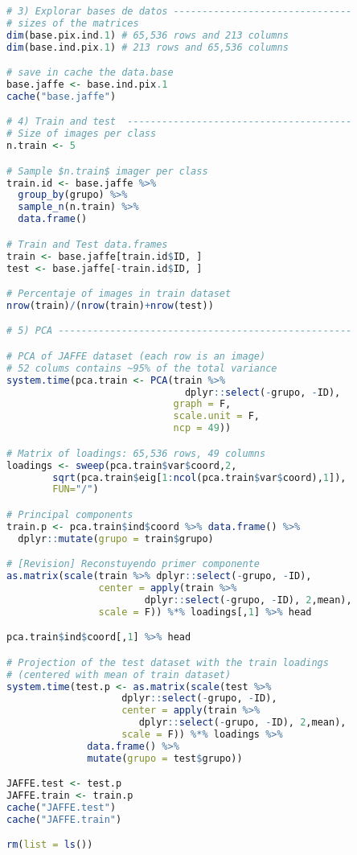 \begin{lstlisting}[language=R, basicstyle=\small]
# 3) Explorar bases de datos -------------------------------
# sizes of the matrices
dim(base.pix.ind.1) # 65,536 rows and 213 columns
dim(base.ind.pix.1) # 213 rows and 65,536 columns

# save in cache the data.base
base.jaffe <- base.ind.pix.1
cache("base.jaffe")

# 4) Train and test  ---------------------------------------
# Size of images per class
n.train <- 5

# Sample $n.train$ imager per class
train.id <- base.jaffe %>% 
  group_by(grupo) %>% 
  sample_n(n.train) %>% 
  data.frame()

# Train and Test data.frames
train <- base.jaffe[train.id$ID, ]
test <- base.jaffe[-train.id$ID, ]

# Percentaje of images in train dataset
nrow(train)/(nrow(train)+nrow(test))

# 5) PCA ---------------------------------------------------

# PCA of JAFFE dataset (each row is an image)
# 52 colums contains ~95% of the total variance
system.time(pca.train <- PCA(train %>% 
                               dplyr::select(-grupo, -ID), 
                             graph = F,
                             scale.unit = F,
                             ncp = 49)) 

# Matrix of loadings: 65,536 rows, 49 columns
loadings <- sweep(pca.train$var$coord,2,
        sqrt(pca.train$eig[1:ncol(pca.train$var$coord),1]),
        FUN="/")

# Principal components 
train.p <- pca.train$ind$coord %>% data.frame() %>% 
  dplyr::mutate(grupo = train$grupo)

# [Revision] Reconstuyendo primer componente 
as.matrix(scale(train %>% dplyr::select(-grupo, -ID), 
                center = apply(train %>%
                        dplyr::select(-grupo, -ID), 2,mean), 
                scale = F)) %*% loadings[,1] %>% head

pca.train$ind$coord[,1] %>% head

# Projection of the test dataset with the train loadings 
# (centered with mean of train dataset)
system.time(test.p <- as.matrix(scale(test %>% 
                    dplyr::select(-grupo, -ID), 
                    center = apply(train %>% 
                       dplyr::select(-grupo, -ID), 2,mean), 
                    scale = F)) %*% loadings %>% 
              data.frame() %>% 
              mutate(grupo = test$grupo))

JAFFE.test <- test.p
JAFFE.train <- train.p
cache("JAFFE.test")
cache("JAFFE.train")

rm(list = ls())
\end{lstlisting}




